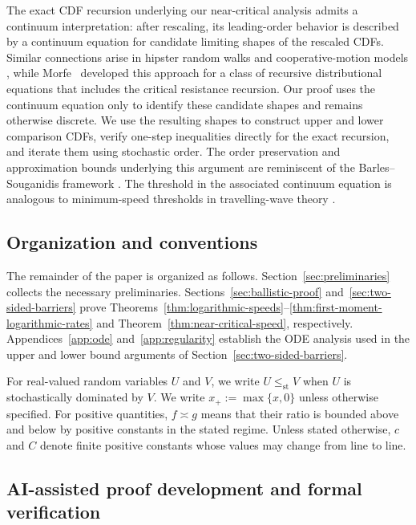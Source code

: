 \documentclass[12pt]{amsart}
\numberwithin{equation}{section}
\theoremstyle{plain}
\theoremstyle{definition}
\newcommand{\stle}{\le_{\mathrm{st}}}
\begin{document}
The exact CDF recursion underlying our near-critical analysis admits a
continuum interpretation: after rescaling, its leading-order behavior is
described by a continuum equation for candidate limiting shapes of the
rescaled CDFs.  Similar connections arise in hipster random walks and
cooperative-motion models
\cite{AddarioBerryEtAl2020,AddarioBerryBeckmanLin2022,
AddarioBerryBeckmanLin2024}, while Morfe~\cite{Morfe2026} developed this
approach for a class of recursive distributional equations that includes the
critical resistance recursion.  Our proof uses
the continuum equation
only to identify these candidate shapes and remains otherwise discrete.  We
use the resulting shapes to construct upper and lower comparison CDFs, verify
one-step inequalities directly for the exact recursion, and iterate them
using stochastic order.  The order preservation and approximation bounds
underlying this argument are reminiscent of the Barles--Souganidis framework
\cite{BarlesSouganidis1991}.  The threshold in the associated continuum
equation is analogous to minimum-speed thresholds in travelling-wave theory
\cite{HadelerRothe1975,SanchezGardunoMaini1994}.

\subsection{Organization and conventions}
\label{sec:organization-conventions}

The remainder of the paper is organized as follows.
Section~\ref{sec:preliminaries} collects the necessary preliminaries.
Sections~\ref{sec:ballistic-proof}
and~\ref{sec:two-sided-barriers} prove
Theorems~\ref{thm:logarithmic-speeds}--\ref{thm:first-moment-logarithmic-rates}
and Theorem~\ref{thm:near-critical-speed}, respectively.
Appendices~\ref{app:ode} and~\ref{app:regularity} establish the
ODE analysis used in the upper and lower bound arguments of Section~\ref{sec:two-sided-barriers}.

For real-valued random variables $U$ and $V$, we write
$U\stle V$ when $U$ is stochastically dominated by $V$.  We write
$x_+:=\max\{x,0\}$ unless otherwise specified.   For positive quantities, $f\asymp g$
means that their ratio is bounded above and below by positive constants in
the stated regime.  Unless stated otherwise, $c$ and $C$ denote finite
positive constants whose values may change from line to line.

\subsection{AI-assisted proof development and formal verification}
\label{subsec:ai-methodology}
\end{document}

